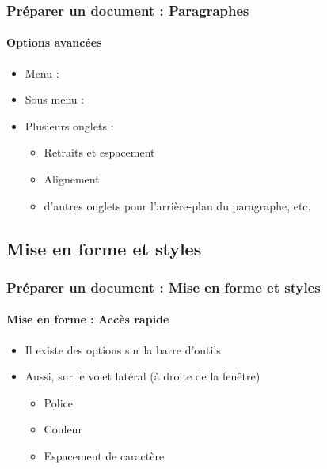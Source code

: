 \documentclass[xcolor=table]{beamer}
\begin{document}
\begin{frame}
\frametitle{Préparer un document : Paragraphes}
\framesubtitle{Options avancées}

\begin{minipage}{0.39\textwidth}
\begin{itemize}
	\item Menu :  
	\item Sous menu : 
	\item Plusieurs onglets : 
	\begin{itemize}
		\item Retraits et espacement 
		\item Alignement
		\item d'autres onglets pour l'arrière-plan du paragraphe, etc.
	\end{itemize}
\end{itemize}
\end{minipage}
\begin{minipage}{0.60\textwidth}
\end{minipage}

\end{frame}

\subsection{Mise en forme et styles}

\begin{frame}
\frametitle{Préparer un document : Mise en forme et styles}
\framesubtitle{Mise en forme : Accès rapide}

\begin{minipage}{0.64\textwidth}
\begin{itemize}
	\item Il existe des options sur la barre d'outils
	\item Aussi, sur le volet latéral (à droite de la fenêtre)
	\begin{itemize}
		\item Police
		\item Couleur 
		\item Espacement de caractère
	\end{itemize}
\end{itemize}

\hfill\null


\end{minipage}
\begin{minipage}{0.35\textwidth}
\end{minipage}

\end{frame}
\end{document}
